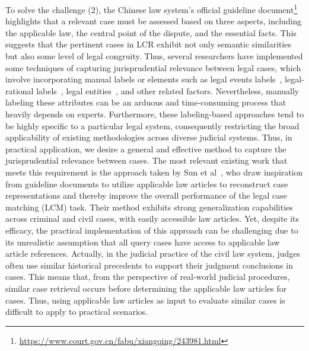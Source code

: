 To solve the challenge (2), the Chinese law system’s official guideline document\footnote{\url{https://www.court.gov.cn/fabu/xiangqing/243981.html}} highlights that a relevant case must be assessed based on three aspects, including the applicable law, the central point of the dispute, and the essential facts.
This suggests that the pertinent cases in LCR exhibit not only semantic similarities but also some level of legal congruity.
Thus, several researchers have implemented some techniques of capturing jurisprudential relevance between legal cases, which involve incorporating manual labels or elements such as legal events labels~\cite{yao2022LEVEN}, legal-rational labels~\cite{yu2022Explainable}, legal entities~\cite{shao2020Bert_PLI}, and other related factors.
Nevertheless, manually labeling these attributes can be an arduous and time-consuming process that heavily depends on experts. 
Furthermore, these labeling-based approaches tend to be highly specific to a particular legal system, consequently restricting the broad applicability of existing methodologies across diverse judicial systems.
Thus, in practical application, we desire a general and effective method to capture the jurisprudential relevance between cases.
The most relevant existing work that meets this requirement is the approach taken by Sun et al~\cite{sun2023law}, who draw inspiration from guideline documents to utilize applicable law articles to reconstruct case representations and thereby improve the overall performance of the legal case matching (LCM) task.
Their method exhibits strong generalization capabilities across criminal and civil cases, with easily accessible law articles.
Yet, despite its efficacy, the practical implementation of this approach can be challenging due to its unrealistic assumption that all query cases have access to applicable law article references. 
Actually, in the judicial practice of the civil law system, judges often use similar historical precedents to support their judgment conclusions in cases.
This means that, from the perspective of real-world judicial procedures, similar case retrieval occurs before determining the applicable law articles for cases.
Thus, using applicable law articles as input to evaluate similar cases is difficult to apply to practical scenarios.

